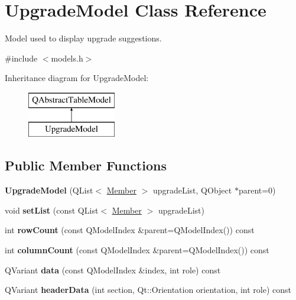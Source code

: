 \hypertarget{class_upgrade_model}{}\section{Upgrade\+Model Class Reference}
\label{class_upgrade_model}


Model used to display upgrade suggestions.  




{\ttfamily \#include $<$models.\+h$>$}

Inheritance diagram for Upgrade\+Model\+:\begin{figure}[H]
\begin{center}
\leavevmode
\includegraphics[height=2.000000cm]{class_upgrade_model}
\end{center}
\end{figure}
\subsection*{Public Member Functions}
\begin{DoxyCompactItemize}
\item 
\mbox{\label{class_upgrade_model_a2c27a6bf6a205c93260d4e81df02bc84}} 
{\bfseries Upgrade\+Model} (Q\+List$<$ \mbox{\hyperlink{class_member}{Member}} $>$ upgrade\+List, Q\+Object $\ast$parent=0)
\item 
\mbox{\label{class_upgrade_model_a324c72de3d429a13b59e2ac0c6537efe}} 
void {\bfseries set\+List} (const Q\+List$<$ \mbox{\hyperlink{class_member}{Member}} $>$ upgrade\+List)
\item 
\mbox{\label{class_upgrade_model_a8ba95dc7d9fbe7906e395bbd28be86d0}} 
int {\bfseries row\+Count} (const Q\+Model\+Index \&parent=Q\+Model\+Index()) const
\item 
\mbox{\label{class_upgrade_model_a57723dfec4222cb10f26e01a8a2c88f4}} 
int {\bfseries column\+Count} (const Q\+Model\+Index \&parent=Q\+Model\+Index()) const
\item 
\mbox{\label{class_upgrade_model_a5ce33da72b8fc37bc0ca8270d65c1365}} 
Q\+Variant {\bfseries data} (const Q\+Model\+Index \&index, int role) const
\item 
\mbox{\label{class_upgrade_model_abeaf588661125d5bb01ea6d73d72ccd0}} 
Q\+Variant {\bfseries header\+Data} (int section, Qt\+::\+Orientation orientation, int role) const
\end{DoxyCompactItemize}
